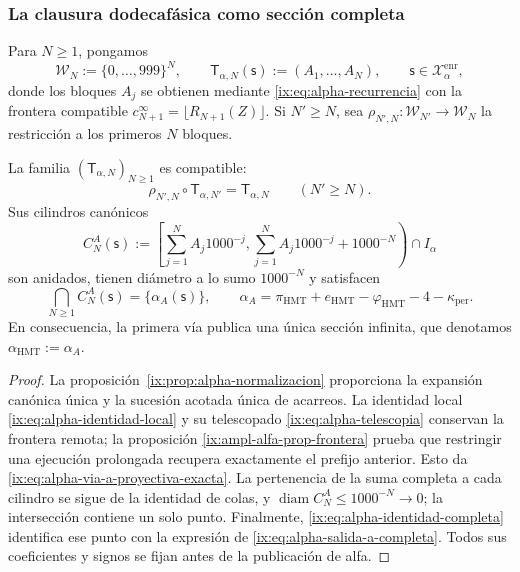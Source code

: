 \subsubsection{La clausura dodecafásica como sección completa}

Para \(N\geq1\), pongamos
\[
 \mathcal W_N:=\{0,\ldots,999\}^{N},
 \qquad
 \mathsf T_{\alpha,N}(\mathsf s):=(A_1,\ldots,A_N),
 \qquad \mathsf s\in\mathcal X_{\alpha}^{\mathrm{enr}},
\]
donde los bloques \(A_j\) se obtienen mediante
\eqref{ix:eq:alpha-recurrencia} con la frontera compatible
\(c_{N+1}^{\infty}=\lfloor R_{N+1}(Z)\rfloor\). Si \(N'\geq N\), sea
\(\rho_{N',N}:\mathcal W_{N'}\to\mathcal W_N\) la restricción a los
primeros \(N\) bloques.

\begin{theorem}
\label{ix:thm:alpha-salida-dodecafasica-completa}
La familia \((\mathsf T_{\alpha,N})_{N\geq1}\) es compatible:
\begin{equation}
 \rho_{N',N}\circ\mathsf T_{\alpha,N'}
 =\mathsf T_{\alpha,N}
 \qquad(N'\geq N).
 \label{ix:eq:alpha-via-a-proyectiva-exacta}
\end{equation}
Sus cilindros canónicos
\begin{equation}
 C_N^A(\mathsf s):=
 \left[
  \sum_{j=1}^{N}A_j1000^{-j},
  \sum_{j=1}^{N}A_j1000^{-j}+1000^{-N}
 \right)\cap I_\alpha
 \label{ix:eq:alpha-cilindros-via-a-exactos}
\end{equation}
son anidados, tienen diámetro a lo sumo \(1000^{-N}\) y satisfacen
\begin{equation}
 \bigcap_{N\geq1}C_N^A(\mathsf s)
 =\{\alpha_A(\mathsf s)\},
 \qquad
 \alpha_A
 =\pi_{\mathrm{HMT}}+e_{\mathrm{HMT}}-\varphi_{\mathrm{HMT}}
  -4-\kappa_{\mathrm{per}}.
 \label{ix:eq:alpha-salida-a-completa}
\end{equation}
En consecuencia, la primera vía publica una única sección infinita, que
denotamos \(\alpha_{\mathrm{HMT}}:=\alpha_A\).
\end{theorem}

\begin{proof}
La proposición~\ref{ix:prop:alpha-normalizacion} proporciona la expansión
canónica única y la sucesión acotada única de acarreos. La identidad local
\eqref{ix:eq:alpha-identidad-local} y su telescopado
\eqref{ix:eq:alpha-telescopia} conservan la frontera remota; la proposición
\ref{ix:ampl-alfa-prop-frontera} prueba que restringir una ejecución prolongada
recupera exactamente el prefijo anterior. Esto da
\eqref{ix:eq:alpha-via-a-proyectiva-exacta}. La pertenencia de la suma completa
a cada cilindro se sigue de la identidad de colas, y
\(\operatorname{diam}C_N^A\leq1000^{-N}\to0\); la intersección contiene un
solo punto. Finalmente, \eqref{ix:eq:alpha-identidad-completa} identifica ese
punto con la expresión de \eqref{ix:eq:alpha-salida-a-completa}. Todos sus
coeficientes y signos se fijan antes de la publicación de alfa.
\end{proof}


